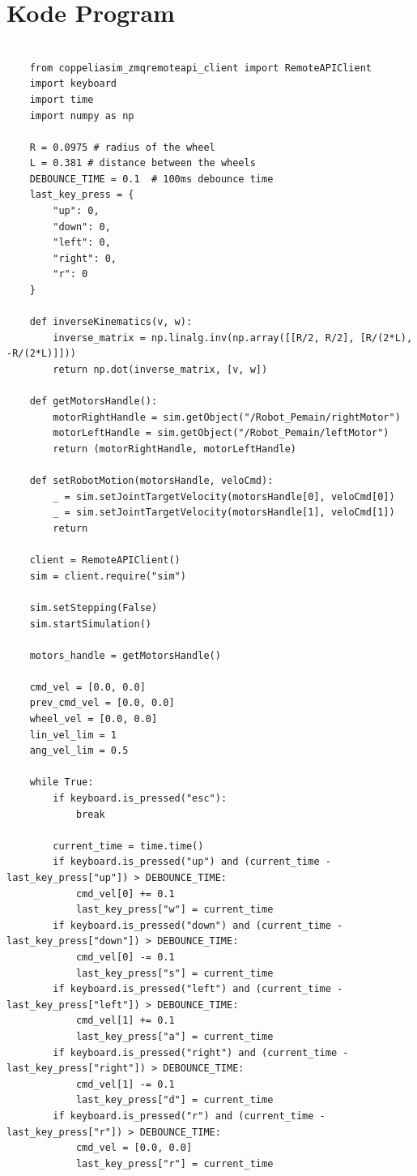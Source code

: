 \documentclass{article}
\begin{document}
\section{Kode Program}

\begin{lstlisting}[style=matlabstyle]

    from coppeliasim_zmqremoteapi_client import RemoteAPIClient
    import keyboard
    import time
    import numpy as np
    
    R = 0.0975 # radius of the wheel
    L = 0.381 # distance between the wheels
    DEBOUNCE_TIME = 0.1  # 100ms debounce time
    last_key_press = {
        "up": 0,
        "down": 0,
        "left": 0,
        "right": 0,
        "r": 0
    }
    
    def inverseKinematics(v, w):
        inverse_matrix = np.linalg.inv(np.array([[R/2, R/2], [R/(2*L), -R/(2*L)]]))
        return np.dot(inverse_matrix, [v, w])
    
    def getMotorsHandle():
        motorRightHandle = sim.getObject("/Robot_Pemain/rightMotor")
        motorLeftHandle = sim.getObject("/Robot_Pemain/leftMotor")
        return (motorRightHandle, motorLeftHandle)
    
    def setRobotMotion(motorsHandle, veloCmd):
        _ = sim.setJointTargetVelocity(motorsHandle[0], veloCmd[0])
        _ = sim.setJointTargetVelocity(motorsHandle[1], veloCmd[1])
        return
    
    client = RemoteAPIClient()
    sim = client.require("sim")
    
    sim.setStepping(False)
    sim.startSimulation()
    
    motors_handle = getMotorsHandle()
    
    cmd_vel = [0.0, 0.0]
    prev_cmd_vel = [0.0, 0.0]
    wheel_vel = [0.0, 0.0]
    lin_vel_lim = 1
    ang_vel_lim = 0.5
    
    while True:
        if keyboard.is_pressed("esc"):
            break
        
        current_time = time.time()
        if keyboard.is_pressed("up") and (current_time - last_key_press["up"]) > DEBOUNCE_TIME:
            cmd_vel[0] += 0.1
            last_key_press["w"] = current_time
        if keyboard.is_pressed("down") and (current_time - last_key_press["down"]) > DEBOUNCE_TIME:
            cmd_vel[0] -= 0.1
            last_key_press["s"] = current_time
        if keyboard.is_pressed("left") and (current_time - last_key_press["left"]) > DEBOUNCE_TIME:
            cmd_vel[1] += 0.1
            last_key_press["a"] = current_time
        if keyboard.is_pressed("right") and (current_time - last_key_press["right"]) > DEBOUNCE_TIME:
            cmd_vel[1] -= 0.1
            last_key_press["d"] = current_time
        if keyboard.is_pressed("r") and (current_time - last_key_press["r"]) > DEBOUNCE_TIME:
            cmd_vel = [0.0, 0.0]
            last_key_press["r"] = current_time
        

\end{lstlisting}
\end{document}
